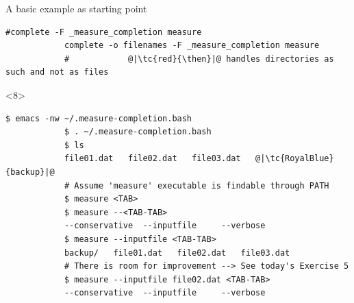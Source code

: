 \begin{frame}[fragile]{A basic example as starting point}
\begin{onlyenv}
\begin{lstlisting}[style=myBash, numbers=none, style=smaller]
            #complete -F _measure_completion measure
            complete -o filenames -F _measure_completion measure
            #            @|\tc{red}{\then}|@ handles directories as such and not as files
        \end{lstlisting}
    \end{onlyenv}
    \begin{onlyenv}<8>
        \begin{lstlisting}[style=myBash, numbers=none, aboveskip=4mm]
            $ emacs -nw ~/.measure-completion.bash
            $ . ~/.measure-completion.bash
            $ ls
            file01.dat   file02.dat   file03.dat   @|\tc{RoyalBlue}{backup}|@
            # Assume 'measure' executable is findable through PATH
            $ measure <TAB>
            $ measure --<TAB-TAB>
            --conservative  --inputfile     --verbose
            $ measure --inputfile <TAB-TAB>
            backup/   file01.dat   file02.dat   file03.dat
            # There is room for improvement --> See today's Exercise 5
            $ measure --inputfile file02.dat <TAB-TAB>
            --conservative  --inputfile     --verbose
        \end{lstlisting}
    \end{onlyenv}
\end{frame}

